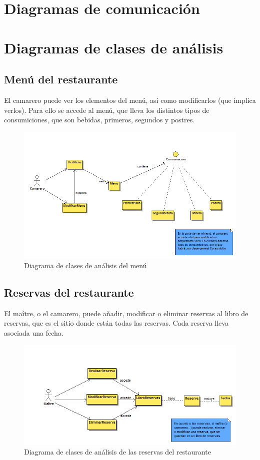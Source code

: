 \documentclass[spanish,a4paper,11pt, twoside]{report}	%
\begin{document}
	\section{Diagramas de comunicación}


	\section{Diagramas de clases de análisis}
		\subsection{Menú del restaurante}
		El camarero puede ver los elementos del menú, así como modificarlos (que implica verlos). Para ello se accede al menú, que lleva los distintos tipos de consumiciones, que son bebidas, primeros, segundos y postres.
		\begin{figure}[!h]
		\centering
		\includegraphics[scale=0.5]{DCAmenu.png}
		\caption{Diagrama de clases de análisis del menú}
		\end{figure}

		\subsection{Reservas del restaurante}
		El maître, o el camarero, puede añadir, modificar o eliminar reservas al libro de reservas, que es el sitio donde están todas las reservas. Cada reserva lleva asociada una fecha.
		\begin{figure}[!h]
		\centering
		\includegraphics[scale=0.5]{DCAresevas.png}
		\caption{Diagrama de clases de análisis de las reservas del restaurante}
		\end{figure}
\end{document}
